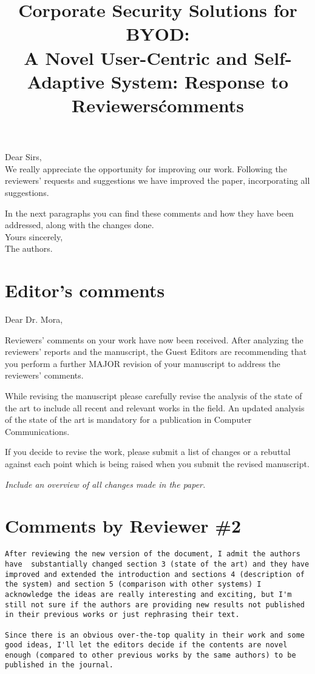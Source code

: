 \documentclass[preprint]{elsarticle}
\begin{document}

\title{Corporate Security Solutions for BYOD:\\ A Novel User-Centric and Self-Adaptive System: Response to Reviewers\' comments}

\noindent
Dear Sirs,\\

We really appreciate the opportunity for improving our work. Following the reviewers' requests and suggestions we have improved the paper, incorporating all suggestions.  

In the next paragraphs you can find these comments and how they have been addressed, along with the changes done.\\

\noindent
Yours sincerely,\\
The authors.


\section{Editor's comments}
Dear Dr. Mora,

Reviewers' comments on your work have now been received. After analyzing the reviewers' reports and the manuscript, the Guest Editors are recommending that you perform a further MAJOR revision of your manuscript to address the reviewers' comments.

While revising the manuscript please carefully revise the analysis of the state of the art to include all recent and relevant works in the field.
An updated analysis of the state of the art is mandatory for a publication in Computer Communications.

If you decide to revise the work, please submit a list of changes or a rebuttal against each point which is being raised when you submit the revised manuscript.



\textit{Include an overview of all changes made in the paper.}

\section{Comments by Reviewer \#2}

\begin{verbatim}
After reviewing the new version of the document, I admit the authors have  substantially changed section 3 (state of the art) and they have improved and extended the introduction and sections 4 (description of the system) and section 5 (comparison with other systems) I acknowledge the ideas are really interesting and exciting, but I'm still not sure if the authors are providing new results not published in their previous works or just rephrasing their text.

Since there is an obvious over-the-top quality in their work and some good ideas, I'll let the editors decide if the contents are novel enough (compared to other previous works by the same authors) to be published in the journal.


\end{verbatim}
\end{document}
